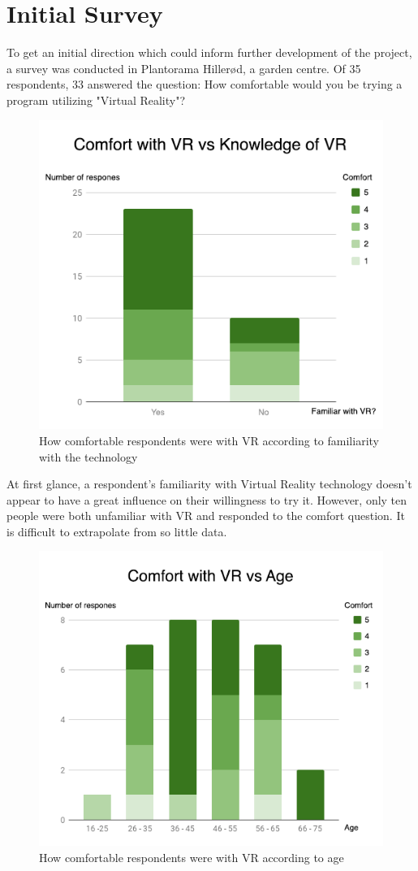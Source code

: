 \section{Initial Survey}

To get an initial direction which could inform further development of the project, a survey was conducted in Plantorama Hillerød, a garden centre. Of 35 respondents, 33 answered the question: How comfortable would you be trying a program utilizing "Virtual Reality"?

\begin{figure}[H]
	\centering
	\includegraphics[width=0.6\linewidth]{figure/Analysis/comfort.png}
	\caption{How comfortable respondents were with VR according to familiarity with the technology}
	\label{fig:comfort}
\end{figure}

At first glance, a respondent's familiarity with Virtual Reality technology doesn't appear to have a great influence on their willingness to try it. However, only ten people were both unfamiliar with VR and responded to the comfort question. It is difficult to extrapolate from so little data.

\begin{figure}[H]
	\centering
	\includegraphics[width=0.6\linewidth]{figure/Analysis/vrcomfort.png}
	\caption{How comfortable respondents were with VR according to age}
	\label{fig:vrcomfort}
\end{figure}

